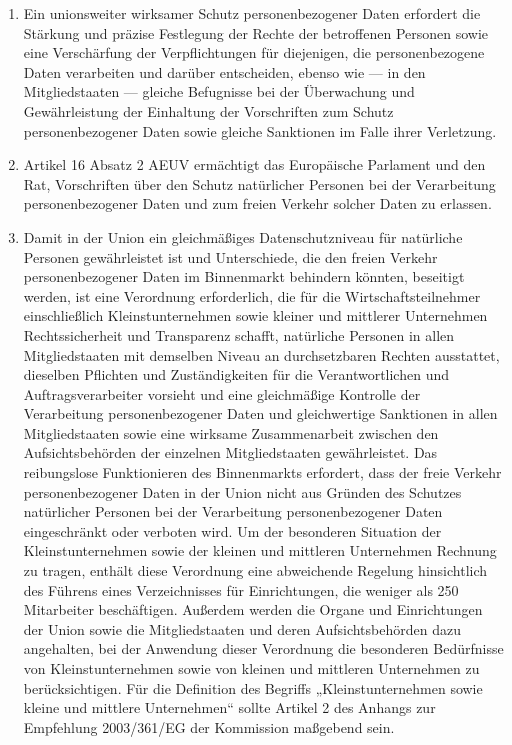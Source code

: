 \begin{enumerate}

   \item Ein unionsweiter wirksamer Schutz personenbezogener Daten erfordert die Stärkung und präzise Festlegung der
    Rechte der betroffenen Personen sowie eine Verschärfung der Verpflichtungen für diejenigen, die personenbezogene
    Daten verarbeiten und darüber entscheiden, ebenso wie — in den Mitgliedstaaten — gleiche Befugnisse bei der
    Überwachung und Gewährleistung der Einhaltung der Vorschriften zum Schutz personenbezogener Daten sowie gleiche
    Sanktionen im Falle ihrer Verletzung.%
   \label{eg:11}
   

   \item Artikel 16 Absatz 2 AEUV ermächtigt das Europäische Parlament und den Rat, Vorschriften über den Schutz
    natürlicher Personen bei der Verarbeitung personenbezogener Daten und zum freien Verkehr solcher Daten zu
    erlassen.%
   \label{eg:12}
   

   \item Damit in der Union ein gleichmäßiges Datenschutzniveau für natürliche Personen gewährleistet ist und
    Unterschiede, die den freien Verkehr personenbezogener Daten im Binnenmarkt behindern könnten, beseitigt werden,
    ist eine Verordnung erforderlich, die für die Wirtschaftsteilnehmer einschließlich Kleinstunternehmen sowie kleiner
    und mittlerer Unternehmen Rechtssicherheit und Transparenz schafft, natürliche Personen in allen Mitgliedstaaten
    mit demselben Niveau an durchsetzbaren Rechten ausstattet, dieselben Pflichten und Zuständigkeiten für die
    Verantwortlichen und Auftragsverarbeiter vorsieht und eine gleichmäßige Kontrolle der Verarbeitung
    personenbezogener Daten und gleichwertige Sanktionen in allen Mitgliedstaaten sowie eine wirksame Zusammenarbeit
    zwischen den Aufsichtsbehörden der einzelnen Mitgliedstaaten gewährleistet. Das reibungslose Funktionieren des
    Binnenmarkts erfordert, dass der freie Verkehr personenbezogener Daten in der Union nicht aus Gründen des Schutzes
    natürlicher Personen bei der Verarbeitung personenbezogener Daten eingeschränkt oder verboten wird. Um der
    besonderen Situation der Kleinstunternehmen sowie der kleinen und mittleren Unternehmen Rechnung zu tragen, enthält
    diese Verordnung eine abweichende Regelung hinsichtlich des Führens eines Verzeichnisses für Einrichtungen, die
    weniger als 250 Mitarbeiter beschäftigen. Außerdem werden die Organe und Einrichtungen der Union sowie die
    Mitgliedstaaten und deren Aufsichtsbehörden dazu angehalten, bei der Anwendung dieser Verordnung die besonderen
    Bedürfnisse von Kleinstunternehmen sowie von kleinen und mittleren Unternehmen zu berücksichtigen. Für die
    Definition des Begriffs „Kleinstunternehmen sowie kleine und mittlere Unternehmen“ sollte Artikel 2 des Anhangs zur
    Empfehlung 2003/361/EG der Kommission maßgebend sein.%
   \label{eg:13}
   

\end{enumerate}
